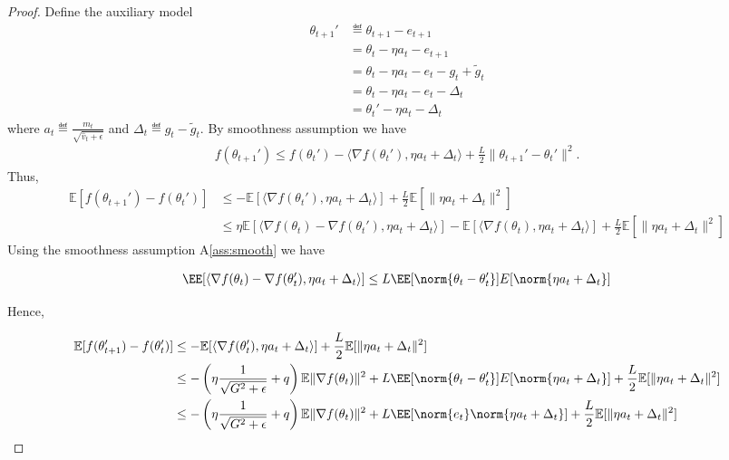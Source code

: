 \documentclass[11pt]{article}
\begin{document}
\begin{proof}
Define the auxiliary model
\begin{align*}
\theta_{t+1}'&\eqdef \theta_{t+1}- e_{t+1}\\
&=\theta_t - \eta a_t- e_{t+1}\\
& =\theta_t - \eta a_t- e_{t} - g_t + \tilde g_t\\ 
& =\theta_t - \eta a_t- e_{t} - \Delta_t\\
& =\theta_t' - \eta a_t - \Delta_t
\end{align*}
where $a_t \eqdef \frac{m_t}{\sqrt{\hat v_t+\epsilon}}$ and $\Delta_t \eqdef g_t - \tilde g_t$.
By smoothness assumption we have
\begin{align*}
    f(\theta_{t+1}')\leq f(\theta_t')-\langle \nabla f(\theta_t'), \eta a_t + \Delta_t \rangle+\frac{L}{2}\| \theta_{t+1}'-\theta_t'\|^2.
\end{align*}
Thus,
\begin{align*}
    \mathbb E[f(\theta_{t+1}')-f(\theta_t')]&\leq -\mathbb E[\langle \nabla f(\theta_t'), \eta a_t + \Delta_t \rangle]+\frac{L}{2}\mathbb E[\|\eta a_t + \Delta_t\|^2]\\
        & \leq \eta\mathbb E[\langle \nabla f(\theta_t) -  \nabla f(\theta_t') , \eta a_t + \Delta_t \rangle] -\mathbb E[\langle  \nabla f(\theta_t), \eta  a_t + \Delta_t \rangle] +\frac{L}{2}\mathbb E[\|\eta a_t + \Delta_t\|^2]
\end{align*}
Using the smoothness assumption A\ref{ass:smooth} we have 

\begin{align*}
\EE[\langle \nabla f(\theta_t) -  \nabla f(\theta_t') , \eta a_t + \Delta_t \rangle] \leq L \EE[\norm{\theta_t - \theta_t'}] E[\norm{\eta a_t + \Delta_t}]
\end{align*}

Hence,

\begin{align*}
    \mathbb E[f(\theta_{t+1}')-f(\theta_t')]&\leq -\mathbb E[\langle \nabla f(\theta_t'), \eta a_t + \Delta_t \rangle]+\frac{L}{2}\mathbb E[\|\eta a_t + \Delta_t\|^2]\\
        & \leq - \left( \eta\frac{1}{\sqrt{G^2+\epsilon}} + q \right) \mathbb E\|\nabla f(\theta_t)\|^2 + L \EE[\norm{\theta_t - \theta_t'}] E[\norm{\eta a_t + \Delta_t}]+\frac{L}{2}\mathbb E[\|\eta a_t + \Delta_t\|^2]\\
                & \leq - \left( \eta\frac{1}{\sqrt{G^2+\epsilon}} + q \right) \mathbb E\|\nabla f(\theta_t)\|^2 + L \EE[\norm{e_t}\norm{\eta a_t + \Delta_t}]+\frac{L}{2}\mathbb E[\|\eta a_t + \Delta_t\|^2]
\end{align*}


\end{proof}
\end{document}
